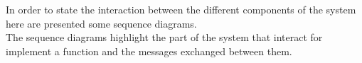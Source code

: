In order to state the interaction between the different components of the system here are presented some sequence diagrams.
\\The sequence diagrams highlight the part of the system that interact for implement a function and the messages exchanged between them.

